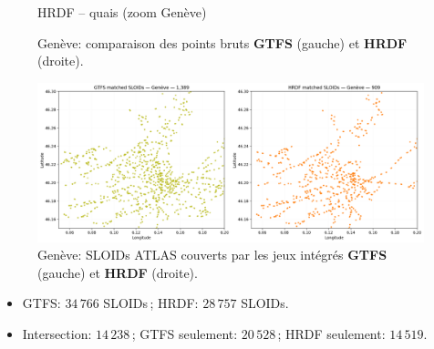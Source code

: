 \begin{figure}[H]
\begin{minipage}[t]{0.49\linewidth}
    \vspace{0.2em}
    \small HRDF – quais (zoom Genève)
  \end{minipage}
  \caption[Genève: GTFS vs HRDF (points bruts)]{Genève: comparaison des points bruts \textbf{GTFS} (gauche) et \textbf{HRDF} (droite).}
  \label{fig:geneva_gtfs_hrdf_raw}
\end{figure}

\begin{figure}[H]
  \centering
  \includegraphics[width=.95\linewidth]{figures/plots/geneva_matched_sloids_gtfs_hrdf.png}
  \caption[Genève: SLOIDs appariés (GTFS vs HRDF)]{Genève: SLOIDs ATLAS couverts par les jeux intégrés \textbf{GTFS} (gauche) et \textbf{HRDF} (droite).}
  \label{fig:geneva_matched_sloids}
\end{figure}

\begin{itemize}
  \item GTFS: \textit{\(34\,766\)} SLOIDs\,; HRDF: \textit{\(28\,757\)} SLOIDs.
  \item Intersection: \textit{\(14\,238\)}\,; GTFS seulement: \textit{\(20\,528\)}\,; HRDF seulement: \textit{\(14\,519\)}.
\end{itemize}
